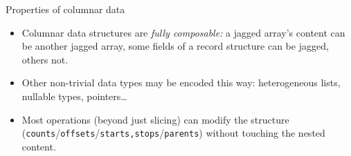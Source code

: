 \documentclass[aspectratio=169]{beamer}
\begin{document}
\begin{frame}{Properties of columnar data}
\Large
\vspace{0.5 cm}
\begin{itemize}\setlength{\itemsep}{0.5 cm}
\item<1-> Columnar data structures are {\it fully composable:} a jagged array's content can be another jagged array, some fields of a record structure can be jagged, others not.

\item<2-> Other non-trivial data types may be encoded this way: heterogeneous lists, nullable types, pointers\ldots

\item<3-> Most operations (beyond just slicing) can modify the structure ({\tt counts}/{\tt offsets}/{\tt starts,stops}/{\tt parents}) without touching the nested content.
\end{itemize}
\end{frame}




\end{document}
